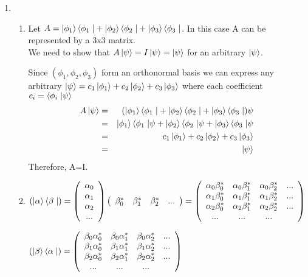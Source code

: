 \documentclass[11pt,fleqn]{article}
\begin{document}
\begin{enumerate}
\item %
\begin{enumerate}
\item %
Let $A = \left | \phi_1 \right \rangle\left \langle \phi_1 \right.| + \left | \phi_2 \right \rangle\left \langle \phi_2 \right.| + \left | \phi_3 \right \rangle\left \langle \phi_3 \right.|$. In this case A can be represented by a 3x3 matrix.\\ We need to show that $A\left | \psi \right \rangle = I\left | \psi \right \rangle = \left | \psi \right \rangle$ for an arbitrary $\left | \psi \right \rangle$.

Since $(\phi_1, \phi_2, \phi_3)$ form an orthonormal basis we can express any arbitrary $\left | \psi \right \rangle = c_1\left | \phi_1 \right \rangle + c_2\left | \phi_2 \right \rangle + c_3\left | \phi_3 \right \rangle$ where each coefficient $c_i = \left \langle \phi_i \right. \left | \psi \right \rangle$
\begin{eqnarray}
A\left | \psi \right \rangle &=&  (\left | \phi_1 \right \rangle\left \langle \phi_1 \right.| + \left | \phi_2 \right \rangle\left \langle \phi_2 \right.| + \left | \phi_3 \right \rangle\left \langle \phi_3 \right.|)\psi \\
&=&\left | \phi_1 \right \rangle\left \langle \phi_1 \right.|\psi + \left | \phi_2 \right \rangle\left \langle \phi_2 \right.|\psi + \left | \phi_3 \right \rangle\left \langle \phi_3 \right.|\psi \\
&=&  c_1\left | \phi_1 \right \rangle + c_2\left | \phi_2 \right \rangle + c_3\left | \phi_3 \right \rangle \\
&=& \left | \psi \right \rangle
\end{eqnarray}
Therefore, A=I.
\item %
$(\left | \alpha \right \rangle\left \langle \beta \right.|) =
\left(\begin{array}{c c c c }
\alpha_0 \\
\alpha_1 \\
\alpha_2 \\
...
\end{array}\right)
\left(\begin{array}{c c c c }
\beta_0^* & \beta_1^* & \beta_2^* & ... 
\end{array}\right)
=
\left(\begin{array}{c c c c }
\alpha_0\beta_0^{*} & \alpha_0\beta_1^{*} & \alpha_0\beta_2^{*} & ...\\
\alpha_1\beta_0^{*} & \alpha_1\beta_1^{*} & \alpha_1\beta_2^{*} & ...\\
\alpha_2\beta_0^{*} & \alpha_2\beta_1^{*} & \alpha_2\beta_2^{*} & ...\\
... & ... & ...
\end{array}\right)$

$(\left | \beta \right \rangle\left \langle \alpha \right.|) = 
\left(\begin{array}{c c c c }
\beta_0\alpha_0^{*} & \beta_0\alpha_1^{*} & \beta_0\alpha_2^{*} & ...\\
\beta_1\alpha_0^{*} & \beta_1\alpha_1^{*} & \beta_1\alpha_2^{*} & ...\\
\beta_2\alpha_0^{*} & \beta_2\alpha_1^{*} & \beta_2\alpha_2^{*} & ...\\
... & ... & ...
\end{array}\right)$


\end{enumerate}
\end{enumerate}
\end{document}

